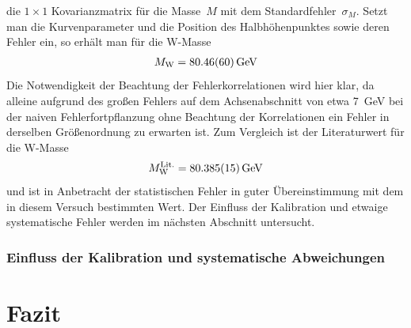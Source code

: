 \documentclass[11pt, a4paper]{article}
\numberwithin{equation}{section}
\begin{document}
die $1 \times 1$ Kovarianzmatrix für die Masse~$M$ mit dem Standardfehler~$\sigma_M$.
Setzt man die Kurvenparameter und die Position des Halbhöhenpunktes sowie deren Fehler ein, so erhält man für die W-Masse
\begin{align*}
	M_\mathrm{W} = \SI{80.46 +- 0.60}{\GeV}
\end{align*}
Die Notwendigkeit der Beachtung der Fehlerkorrelationen wird hier klar, da alleine aufgrund des großen Fehlers auf dem Achsenabschnitt von etwa \SI{7}{\GeV} bei der naiven Fehlerfortpflanzung ohne Beachtung der Korrelationen ein Fehler in derselben Größenordnung zu erwarten ist.
Zum Vergleich ist der Literaturwert für die W-Masse \cite{pdg}
\begin{align*}
	M_\mathrm{W}^\mathrm{Lit.} = \SI{80.385 +- 0.015}{\GeV}
\end{align*}
und ist in Anbetracht der statistischen Fehler in guter Übereinstimmung mit dem in diesem Versuch bestimmten Wert.
Der Einfluss der Kalibration und etwaige systematische Fehler werden im nächsten Abschnitt untersucht.

\subsubsection{Einfluss der Kalibration und systematische Abweichungen}



\section{Fazit}
\end{document}
